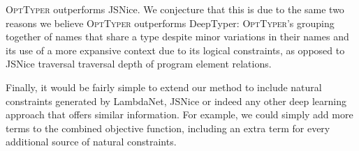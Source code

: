 \documentclass[acmsmall, review, anonymous]{acmart}\settopmatter{printfolios=true,printccs=false,printacmref=false}
\newcommand{\projectname}{\textsc{OptTyper}\xspace}
\newcommand{\margincomment}[2]{\marginpar{\scriptsize\color{Maroon}#1 says: #2}}
\newcommand{\cas}[1]{\margincomment{Charles}{#1}}
\begin{document}


\projectname outperforms JSNice.  We conjecture that this is due
to the same two reasons we believe \projectname outperforms DeepTyper:
\projectname's grouping together of names that share a type despite minor
variations in their names and its use of a more expansive context due to its
logical constraints, as opposed to JSNice  traversal traversal depth of program element
relations.

%
Finally, it would be fairly simple to extend our method to include natural constraints generated by LambdaNet, JSNice or 
indeed any other deep learning approach that offers similar information.
For example, we could simply add more terms to the combined objective function,
including an extra term for every additional source of natural constraints.


\end{document}
